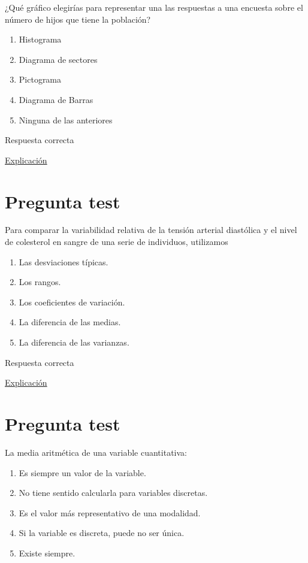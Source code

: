 \documentclass[
]{book}
\providecommand{\tightlist}{%
  \setlength{\itemsep}{0pt}\setlength{\parskip}{0pt}}
\begin{document}
¿Qué gráfico elegirías para representar una las respuestas a una encuesta sobre el número de hijos que tiene la población?

\begin{enumerate}
\def\labelenumi{\alph{enumi})}
\tightlist
\item
  Histograma
\item
  Diagrama de sectores
\item
  Pictograma
\item
  Diagrama de Barras
\item
  Ninguna de las anteriores
\end{enumerate}

Respuesta correcta

\href{https://1fjmanzano.github.io/bioestadistica/diagramas-de-barras-y-sectores.html}{Explicación}

\hypertarget{pregunta-test-61}{%
\section{Pregunta test}\label{pregunta-test-61}}

Para comparar la variabilidad relativa de la tensión arterial diastólica y el nivel de colesterol en sangre de una serie de individuos, utilizamos

\begin{enumerate}
\def\labelenumi{\alph{enumi})}
\tightlist
\item
  Las desviaciones típicas.
\item
  Los rangos.
\item
  Los coeficientes de variación.
\item
  La diferencia de las medias.
\item
  La diferencia de las varianzas.
\end{enumerate}

Respuesta correcta

\href{https://1fjmanzano.github.io/bioestadistica/medidas-de-posicio\%CC\%81n-dispersio\%CC\%81n-y-forma.html}{Explicación}

\hypertarget{pregunta-test-62}{%
\section{Pregunta test}\label{pregunta-test-62}}

La media aritmética de una variable cuantitativa:

\begin{enumerate}
\def\labelenumi{\alph{enumi})}
\tightlist
\item
  Es siempre un valor de la variable.
\item
  No tiene sentido calcularla para variables discretas.
\item
  Es el valor más representativo de una modalidad.
\item
  Si la variable es discreta, puede no ser única.
\item
  Existe siempre.
\end{enumerate}
\end{document}
